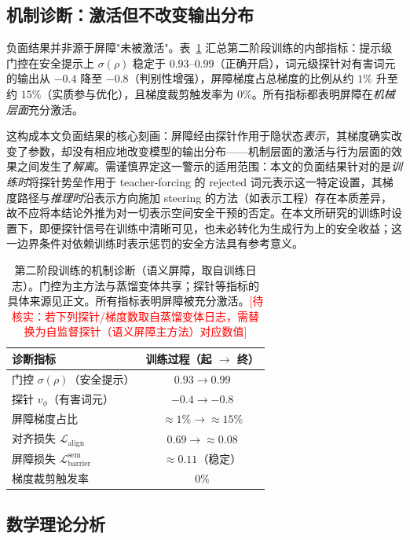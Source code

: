 \documentclass[lettersize,journal]{IEEEtran}
\begin{document}
\subsection{机制诊断：激活但不改变输出分布}\label{exp:diag}
负面结果并非源于屏障"未被激活"。表~\ref{tab:diag} 汇总第二阶段训练的内部指标：提示级门控在安全提示上 $\sigma(\rho)$ 稳定于 $0.93$--$0.99$（正确开启），词元级探针对有害词元的输出从 $-0.4$ 降至 $-0.8$（判别性增强），屏障梯度占总梯度的比例从约 $1\%$ 升至约 $15\%$（实质参与优化），且梯度裁剪触发率为 $0\%$。所有指标都表明屏障在\emph{机械层面}充分激活。

这构成本文负面结果的核心刻画：屏障经由探针作用于隐状态\emph{表示}，其梯度确实改变了参数，却没有相应地改变模型的输出分布——机制层面的激活与行为层面的效果之间发生了\emph{解离}。需谨慎界定这一警示的适用范围：本文的负面结果针对的是\emph{训练时}将探针势垒作用于 teacher-forcing 的 rejected 词元表示这一特定设置，其梯度路径与\emph{推理时}沿表示方向施加 steering 的方法（如表示工程）存在本质差异，故不应将本结论外推为对一切表示空间安全干预的否定。在本文所研究的训练时设置下，即便探针信号在训练中清晰可见，也未必转化为生成行为上的安全收益；这一边界条件对依赖训练时表示惩罚的安全方法具有参考意义。

\begin{table}[t]
\centering
\caption{第二阶段训练的机制诊断（语义屏障，取自训练日志）。门控为主方法与蒸馏变体共享；探针等指标的具体来源见正文。所有指标表明屏障被充分激活。\textcolor{red}{[待核实：若下列探针/梯度数取自蒸馏变体日志，需替换为自监督探针（语义屏障主方法）对应数值]}}
\label{tab:diag}
\begin{tabular}{lc}
\toprule
诊断指标 & 训练过程（起 $\to$ 终） \\
\midrule
门控 $\sigma(\rho)$（安全提示） & $0.93 \to 0.99$ \\
探针 $v_\phi$（有害词元） & $-0.4 \to -0.8$ \\
屏障梯度占比 & $\approx 1\% \to \approx 15\%$ \\
对齐损失 $\mathcal{L}_{\text{align}}$ & $0.69 \to \approx 0.08$ \\
屏障损失 $\mathcal{L}^{\text{sem}}_{\text{barrier}}$ & $\approx 0.11$（稳定） \\
梯度裁剪触发率 & $0\%$ \\
\bottomrule
\end{tabular}
\end{table}





\appendix
\subsection*{数学理论分析}
\end{document}
